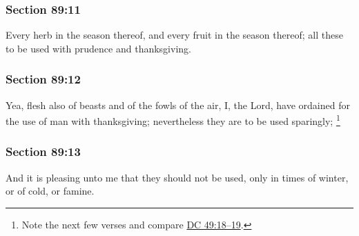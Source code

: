 	\subsubsection{Section 89:11} %
		\label{DC89-11}

		Every herb in the season thereof, and every fruit in the season thereof; all these to be used with prudence and thanksgiving.


	\subsubsection{Section 89:12} %
		\label{DC89-12}

		Yea, flesh also of beasts and of the fowls of the air, I, the Lord, have ordained for the use of man with thanksgiving; nevertheless they are to be used sparingly;%
			\footnote{%
				Note the next few verses and compare \hyperref[DC49-18]{DC 49:18--19}.
				}


	\subsubsection{Section 89:13} %
		\label{DC89-13}

		And it is pleasing unto me that they should not be used, only in times of winter, or of cold, or famine.


